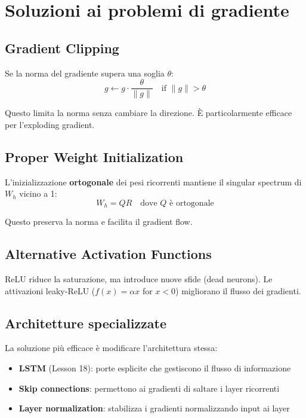 \section{Soluzioni ai problemi di gradiente}

\subsection{Gradient Clipping}

\begin{tcolorbox}[title=Gradient Clipping]
Se la norma del gradiente supera una soglia $\theta$:
\[
g \leftarrow g \cdot \frac{\theta}{\|g\|} \quad \text{if } \|g\| > \theta
\]

Questo limita la norma senza cambiare la direzione. È particolarmente efficace per l'exploding gradient.
\end{tcolorbox}

\subsection{Proper Weight Initialization}

L'inizializzazione \textbf{ortogonale} dei pesi ricorrenti mantiene il singular spectrum di $W_h$ vicino a 1:
\[
W_h = QR \quad \text{dove } Q \text{ è ortogonale}
\]

Questo preserva la norma e facilita il gradient flow.

\subsection{Alternative Activation Functions}

ReLU riduce la saturazione, ma introduce nuove sfide (dead neurons). Le attivazioni leaky-ReLU ($f(x) = \alpha x$ for $x < 0$) migliorano il flusso dei gradienti.

\subsection{Architetture specializzate}

La soluzione più efficace è modificare l'architettura stessa:
\begin{itemize}
\item \textbf{LSTM} (Lesson 18): porte esplicite che gestiscono il flusso di informazione
\item \textbf{Skip connections}: permettono ai gradienti di saltare i layer ricorrenti
\item \textbf{Layer normalization}: stabilizza i gradienti normalizzando input ai layer
\end{itemize}

